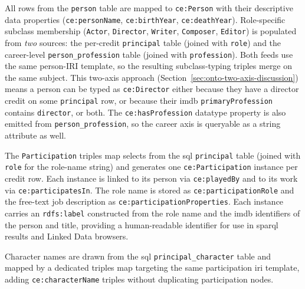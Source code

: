 All rows from the \texttt{person} table are mapped to \texttt{ce:Person} with their descriptive data properties (\texttt{ce:personName}, \texttt{ce:birthYear}, \texttt{ce:deathYear}). Role-specific subclass membership (\texttt{Actor}, \texttt{Director}, \texttt{Writer}, \texttt{Composer}, \texttt{Editor}) is populated from \emph{two} sources: the per-credit \texttt{principal} table (joined with \texttt{role}) and the career-level \texttt{person\_profession} table (joined with \texttt{profession}). Both feeds use the same person-IRI template, so the resulting subclass-typing triples merge on the same subject. This two-axis approach (Section~\ref{sec:onto-two-axis-discussion}) means a person can be typed as \texttt{ce:Director} either because they have a director credit on some \texttt{principal} row, or because their \ac{imdb} \texttt{primaryProfession} contains \texttt{director}, or both. The \texttt{ce:hasProfession} datatype property is also emitted from \texttt{person\_profession}, so the career axis is queryable as a string attribute as well.

The \texttt{Participation} triples map selects from the \ac{sql} \texttt{principal} table (joined with \texttt{role} for the role-name string) and generates one \texttt{ce:Participation} instance per credit row. Each instance is linked to its person via \texttt{ce:playedBy} and to its work via \texttt{ce:participatesIn}. The role name is stored as \texttt{ce:participationRole} and the free-text job description as \texttt{ce:participationProperties}. Each instance carries an \texttt{rdfs:label} constructed from the role name and the \ac{imdb} identifiers of the person and title, providing a human-readable identifier for use in \ac{sparql} results and Linked Data browsers.

Character names are drawn from the \ac{sql} \texttt{principal\_character} table and mapped by a dedicated triples map targeting the same participation \ac{iri} template, adding \texttt{ce:characterName} triples without duplicating participation nodes.

